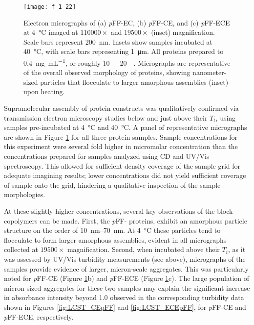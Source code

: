 \begin{refsection}
\begin{figure}[h!] \centering \texttt{[image: f\_1\_22]}
    \caption{Electron micrographs of (a) \emph{p}FF-EC, (b) \emph{p}FF-CE, and
    (c) \emph{p}FF-ECE at \SI{4}{\celsius} imaged at ${110000 \times}$ and
    ${19500 \times}$ (inset) magnification. Scale bars represent \SI{200}{\nm}.
    Insets show samples incubated at \SI{40}{\celsius}, with scale bars
    representing \SI{1}{\um}. All proteins prepared to \SI{0.4}{\mg\per\mL}, or
    roughly \SIrange{10}{20}{\micro\moLar}. Micrographs are representative of
    the overall observed morphology of proteins, showing nanometer-sized
    particles that flocculate to larger amorphous assemblies (inset) upon heating.}
    \label{fig:block_EM_pFF}
\end{figure}

Supramolecular assembly of protein constructs was qualitatively confirmed via
transmission electron microscopy studies below and just above their ${T_t}$,
using samples pre-incubated at \SI{4}{\celsius} and \SI{40}{\celsius}.  A panel
of representative micrographs are shown in Figure \ref{fig:block_EM_pFF} for all
three protein samples. Sample concentrations for this experiment were several
fold higher in micromolar concentration than the concentrations prepared for
samples analyzed using CD and UV/Vis spectroscopy.  This allowed for sufficient
density coverage of the sample grid for adequate imagining results; lower
concentrations did not yield sufficient coverage of sample onto the grid,
hindering a qualitative inspection of the sample morphologies.

At these slightly higher concentrations, several key observations of the block
copolymers can be made. First, the \emph{p}FF- proteins, exhibit an amorphous
particle structure on the order of \SIrange{10}{70}{\nm}. At
\SI{4}{\celsius} these particles tend to flocculate to form larger amorphous
assemblies, evident in all micrographs collected at ${19500 \times}$
magnification. Second, when incubated above their ${T_t}$, as it was assessed by
UV/Vis turbidity measurements (see above), micrographs of the samples provide
evidence of larger, micron-scale aggregates. This was particularly noted for
\emph{p}FF-CE (Figure \ref{fig:block_EM_pFF}b) and \emph{p}FF-ECE (Figure
\ref{fig:block_EM_pFF}c). The large population of micron-sized aggregates for
these two samples may explain the significant increase in absorbance intensity
beyond \SI{1.0}{\AU} observed in the corresponding turbidity data shown in Figures
\ref{fig:LCST_CEpFF} and \ref{fig:LCST_ECEpFF}, for \emph{p}FF-CE and
\emph{p}FF-ECE, respectively.


\end{refsection}
